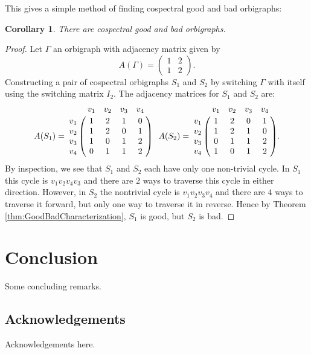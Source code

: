 \documentclass[12pt]{article}
\theoremstyle{plain}
\newtheorem{corollary}[theorem]{Corollary}
\theoremstyle{definition}
\theoremstyle{remark}
\begin{document}
  This gives a simple method of finding cospectral good and bad orbigraphs:

  \begin{corollary}\label{coro:GoodBadCospectral}
    There are cospectral good and bad orbigraphs.
  \end{corollary}
  \begin{proof}
    Let $\Gamma$ an orbigraph with adjacency matrix given by
    $$
    A(\Gamma) = 
      \left( \begin{array}{cc}
        1 & 2 \\
        1 & 2
      \end{array} \right).
    $$
    Constructing a pair of cospectral orbigraphs $S_1$ and $S_2$ by switching $\Gamma$ with itself using the switching matrix $I_2$. The adjacency matrices for $S_1$ and $S_2$ are:
    $$
    A(S_1) = 
      \bordermatrix {
            & v_1 & v_2 & v_3 & v_4 \cr
        v_1 & 1   & 2   & 1   & 0   \cr
        v_2 & 1   & 2   & 0   & 1   \cr
        v_3 & 1   & 0   & 1   & 2   \cr
        v_4 & 0   & 1   & 1   & 2
      } \ \ 
    A(S_2) = 
      \bordermatrix {
            & v_1 & v_2 & v_3 & v_4 \cr
        v_1 & 1   & 2   & 0   & 1   \cr
        v_2 & 1   & 2   & 1   & 0   \cr
        v_3 & 0   & 1   & 1   & 2   \cr
        v_4 & 1   & 0   & 1   & 2
      }.
    $$
    By inspection, we see that $S_1$ and $S_2$ each have only one non-trivial cycle. In $S_1$ this cycle is $v_1 v_2 v_4 v_3$ and there are $2$ ways to traverse this cycle in either direction. However, in $S_2$ the nontrivial cycle is $v_1 v_2 v_3 v_4$ and there are $4$ ways to traverse it forward, but only one way to traverse it in reverse. Hence by Theorem \ref{thm:GoodBadCharacterization}, $S_1$ is good, but $S_2$ is bad.
  \end{proof}


\section{Conclusion}
  Some concluding remarks.


\subsection*{Acknowledgements}
  Acknowledgements here.


%  
%  


\printbibliography
\end{document}
